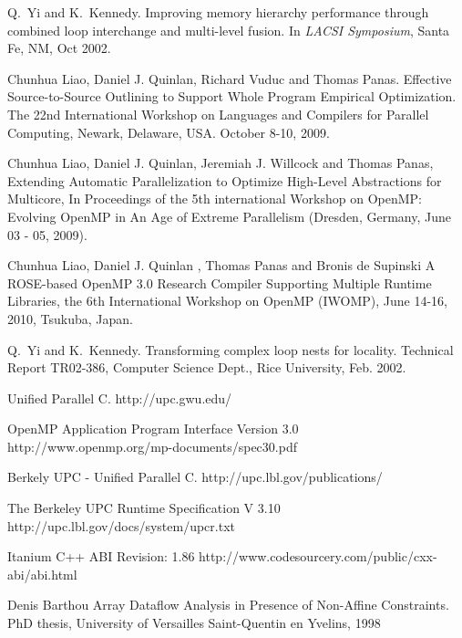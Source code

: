 \begin{thebibliography}{WW}
Q.~Yi and K.~Kennedy.
\newblock Improving memory hierarchy performance through combined loop
  interchange and multi-level fusion.
\newblock In {\em LACSI Symposium}, Santa Fe, NM, Oct 2002.

Chunhua Liao, Daniel J. Quinlan, Richard Vuduc and Thomas Panas.
\newblock Effective Source-to-Source Outlining to Support Whole Program
Empirical Optimization.
\newblock The 22nd International Workshop on Languages and Compilers for Parallel Computing, Newark, Delaware, USA. October 8-10, 2009.

Chunhua Liao, Daniel J. Quinlan, Jeremiah J. Willcock and Thomas Panas,
\newblock Extending Automatic Parallelization to Optimize High-Level
Abstractions for Multicore,
\newblock In Proceedings of the 5th international Workshop on OpenMP:
Evolving OpenMP in An Age of Extreme Parallelism (Dresden, Germany, June 03
- 05, 2009).

Chunhua Liao, Daniel J. Quinlan , Thomas Panas and Bronis de Supinski
\newblock A ROSE-based OpenMP 3.0 Research Compiler Supporting Multiple
Runtime Libraries,
\newblock the 6th International Workshop on OpenMP (IWOMP), June 14-16,
2010, Tsukuba, Japan.




Q.~Yi and K.~Kennedy.
\newblock Transforming complex loop nests for locality.
\newblock Technical Report TR02-386, Computer Science Dept., Rice University,
  Feb. 2002.

\newblock Unified Parallel C.
\newblock http://upc.gwu.edu/

\newblock OpenMP Application Program Interface Version 3.0
\newblock http://www.openmp.org/mp-documents/spec30.pdf

\newblock Berkely UPC - Unified Parallel C.
\newblock http://upc.lbl.gov/publications/

\newblock The Berkeley UPC Runtime Specification V 3.10
\newblock http://upc.lbl.gov/docs/system/upcr.txt

\newblock Itanium C++ ABI Revision: 1.86
\newblock http://www.codesourcery.com/public/cxx-abi/abi.html

Denis Barthou
\newblock Array Dataflow Analysis in Presence of Non-Affine Constraints.
\newblock PhD thesis, University of Versailles Saint-Quentin en Yvelins, 1998


\end{thebibliography}
